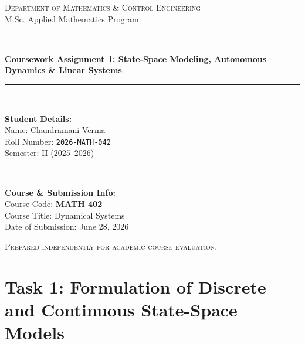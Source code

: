 \documentclass[12pt,a4paper]{article}
\theoremstyle{definition}
\theoremstyle{plain}
\begin{document}
\begin{titlepage}
    \centering
    \vspace*{1.5cm}
    
    {\Large \scshape Department of Mathematics \& Control Engineering}\\[0.3cm]
    {\large M.Sc. Applied Mathematics Program}\\[1.5cm]
    
    \rule{\linewidth}{1.2pt}\\[0.4cm]
    {\huge \bfseries Coursework Assignment 1: State-Space Modeling, Autonomous Dynamics \& Linear Systems}\\[0.3cm]
    \rule{\linewidth}{1.2pt}\\[1.8cm]
    
    \begin{minipage}{0.48\textwidth}
        \begin{flushleft} \large
        \textbf{Student Details:}\\
        Name: Chandramani Verma\\
        Roll Number: \texttt{2026-MATH-042}\\
        Semester: II (2025--2026)
        \end{flushleft}
    \end{minipage}
    ~
    \begin{minipage}{0.48\textwidth}
        \begin{flushright} \large
        \textbf{Course & Submission Info:}\\
        Course Code: \textbf{MATH 402}\\
        Course Title: Dynamical Systems\\
        Date of Submission: June 28, 2026
        \end{flushright}
    \end{minipage}

    \vfill
    
    {\small \scshape Prepared independently for academic course evaluation.}
    \vspace*{1cm}
\end{titlepage}

\newpage
\tableofcontents
\newpage

\section{Task 1: Formulation of Discrete and Continuous State-Space Models}
\end{document}
